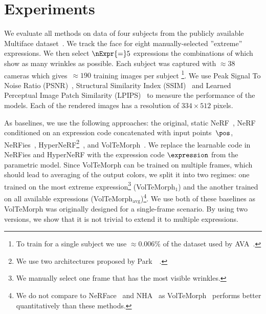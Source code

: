 % 




\section{Experiments}
  \label{sec:blendfields-experiments}

  We evaluate all methods on data of four subjects from the publicly available
  Multiface dataset~\cite{wuu2022multiface}.
  We track the face for eight manually-selected ''extreme'' expressions.
  We then select $\nExpr{=}5$ expressions the combinations of which show as many
  wrinkles as possible.
  Each subject was captured with $\approx\!
    \!38$ cameras which gives~$\approx\!\!190$ training images per subject
  \footnote{To train \blendfields for a single subject we use $\approx0.006\%$ of the dataset used by AVA~\cite{cao2022authentic}.}.
  We use Peak Signal To Noise Ratio (PSNR)~\cite{avcibas2002statistical},
  Structural Similarity Index (SSIM)~\cite{wang2003multiscale} and Learned
  Perceptual Image Patch Similarity (LPIPS)~\cite{zhang2018perceptual} to
  measure the performance of the models.
  Each of the rendered images has a resolution of $334{\times}512$ pixels.

  As baselines, we use the following approaches: the original, static
  NeRF~\cite{mildenhall2020nerf}, NeRF conditioned on an expression code
  concatenated with input points~$\pos$, NeRFies~\cite{park2021nerfies},
  HyperNeRF\footnote{We use two architectures proposed by
    Park~\etal~\cite{park2021hypernerf}.
  }~\cite{park2021hypernerf}, and VolTeMorph~\cite{garbin2024voltemorph}.
  We replace the learnable code in NeRFies and HyperNeRF with the expression
  code $\expression$ from the parametric model.
  Since VolTeMorph can be trained on multiple frames, which should lead to
  averaging of the output colors, we split it into two regimes: one trained on
  the most extreme expression\footnote{We manually select one frame that has the
    most visible wrinkles.
  } (VolTeMorph$_1$) and the another trained on all available expressions (VolTeMorph$_\text{avg}$)\footnote{We do not compare to NeRFace~\cite{gafni2021dynamic} and NHA~\cite{grassal2022neural} as VolTeMorph~\cite{garbin2024voltemorph} performs better quantitatively than these methods.}.
  We use both of these baselines as VolTeMorph was originally designed for a
  single-frame scenario.
  By using two versions, we show that it is not trivial to extend it to multiple
  expressions.

